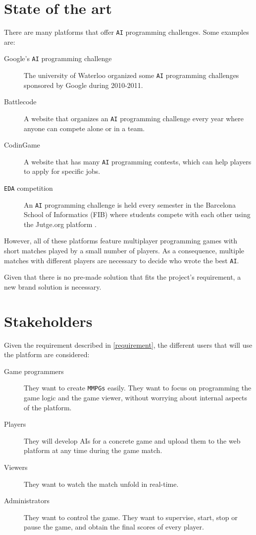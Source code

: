 \documentclass[a4paper,11pt,titlepage,abstract,numbers=noenddot,automark,mnsy,intlimits,rgb,dvipsnames]{report}
\begin{document}
\section{State of the art}
\label{state_of_the_art}
There are many platforms that offer \texttt{AI} programming challenges. Some examples are:
\begin{description}
\item[Google's \texttt{AI} programming challenge \cite{google_ai}]
The university of Waterloo organized some \texttt{AI} programming challenges
  sponsored by Google during 2010-2011.
\item[Battlecode \cite{battlecode}]
A website that organizes an \texttt{AI} programming challenge every year where anyone can
  compete alone or in a team.
\item[CodinGame \cite{codingame}]
A website that has many \texttt{AI} programming contests, which can help players to apply for
  specific jobs.
\item[\texttt{EDA} competition \cite{eda}]
An \texttt{AI} programming challenge is held every semester in the Barcelona School of
  Informatics (FIB) where students compete with each other using the Jutge.org platform \cite{jutge}.
\end{description}
However, all of these platforms feature multiplayer programming games with short matches played by a
small number of players. As a consequence, multiple matches with different players are necessary to decide who wrote
the best \texttt{AI}.

Given that there is no pre-made solution that fits the project's requirement, a new brand solution is necessary.
\section{Stakeholders}
Given the requirement described in \autoref{requirement}, the different users that will use the platform are considered:
\begin{description}
\item[Game programmers]
They want to create \texttt{MMPGs} easily. They want to focus on programming the game logic and the
  game viewer, without worrying about internal aspects of the platform.
\item[Players]
They will develop \texttt{}AI\texttt{}s for a concrete game and upload them to the web platform at any time during
  the game match.
\item[Viewers]
They want to watch the match unfold in real-time.
\item[Administrators]
They want to control the game. They want to supervise, start, stop or pause the game, and obtain
  the final scores of every player.
\end{description}
\clearpage
\end{document}
